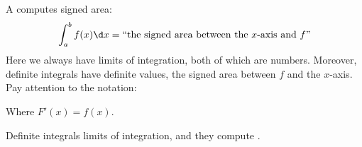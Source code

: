 \documentclass{ximera}
\begin{document}
A  computes signed area:
\[
\int_a^b f(x) \d x = \text{``the signed area between the $x$-axis and $f$''}
\]
Here we always have limits of integration, both of which are
numbers. Moreover, definite integrals have definite values, the signed
area between $f$ and the $x$-axis. Pay attention to the notation:
\begin{image}
\end{image}
Where $F'(x) = f(x)$.
\begin{explanation}%
  Definite integrals  limits of integration, and they compute
  .
\end{explanation}
\end{document}
